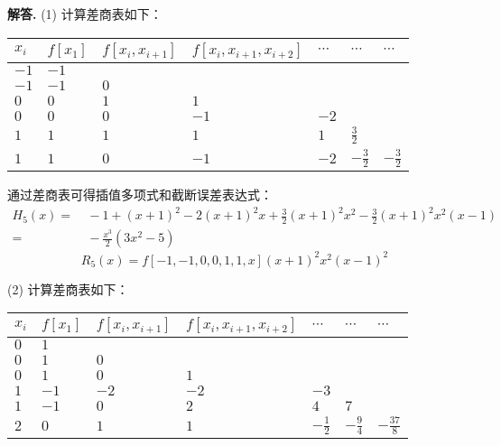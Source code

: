 \documentclass[12pt, a4paper, oneside]{ctexart}
\newenvironment{solution}{\par\noindent\textbf{解答. }}{\bigskip\par}
\begin{document}
\begin{solution} (1) 计算差商表如下：
    \renewcommand\arraystretch{0.8}
    \begin{table}[!htbp]
        \centering
        \begin{tabular}{p{1cm}<{\centering}p{1cm}<{\centering}p{2cm}<{\centering}p{3cm}<{\centering}p{1cm}<{\centering}p{1cm}<{\centering}p{1cm}<{\centering}}
            \toprule
            $x_i$ & $f[x_1]$ & $f[x_i,x_{i+1}]$ & $f[x_i,x_{i+1},x_{i+2}]$ & $\cdots$ & $\cdots$ & $\cdots$\\
            \midrule
            $-1$ & $-1$ & & & & & \\
            $-1$ & $-1$ & $0$ & & & & \\
            $0$ & $0$ & $1$ & $1$ & & & \\
            $0$ & $0$ & $0$ & $-1$ & $-2$ & & \\
            $1$ & $1$ & $1$ & $1$ & $1$ & $\frac{3}{2}$ & \\
            $1$ & $1$ & $0$ & $-1$ & $-2$ & $-\frac{3}{2}$ & $-\frac{3}{2}$\\
            \bottomrule
        \end{tabular}
    \end{table}

    通过差商表可得插值多项式和截断误差表达式：
    \begin{equation*}
        \begin{aligned}
            H_5(x) =&\ -1+(x+1)^2-2(x+1)^2x+\frac{3}{2}(x+1)^2x^2-\frac{3}{2}(x+1)^2x^2(x-1)\\
            =&\ -\frac{x^3}{2}(3x^2-5)
        \end{aligned}
    \end{equation*}
    \begin{equation*}
        R_5(x)=f[-1,-1,0,0,1,1,x](x+1)^2x^2(x-1)^2
    \end{equation*}

    (2) 计算差商表如下：
    \renewcommand\arraystretch{0.8}
    \begin{table}[!htbp]
        \centering
        \begin{tabular}{p{1cm}<{\centering}p{1cm}<{\centering}p{2cm}<{\centering}p{3cm}<{\centering}p{1cm}<{\centering}p{1cm}<{\centering}p{1cm}<{\centering}}
            \toprule
            $x_i$ & $f[x_1]$ & $f[x_i,x_{i+1}]$ & $f[x_i,x_{i+1},x_{i+2}]$ & $\cdots$ & $\cdots$ & $\cdots$\\
            \midrule
            $0$ & $1$ & & & & & \\
            $0$ & $1$ & $0$ & & & & \\
            $0$ & $1$ & $0$ & $1$ & & & \\
            $1$ & $-1$ & $-2$ & $-2$ & $-3$ & & \\
            $1$ & $-1$ & $0$ & $2$ & $4$ & $7$ & \\
            $2$ & $0$ & $1$ & $1$ & $-\frac{1}{2}$ & $-\frac{9}{4}$ & $-\frac{37}{8}$\\
            \bottomrule
        \end{tabular}
    \end{table}


\end{solution}
\end{document}
